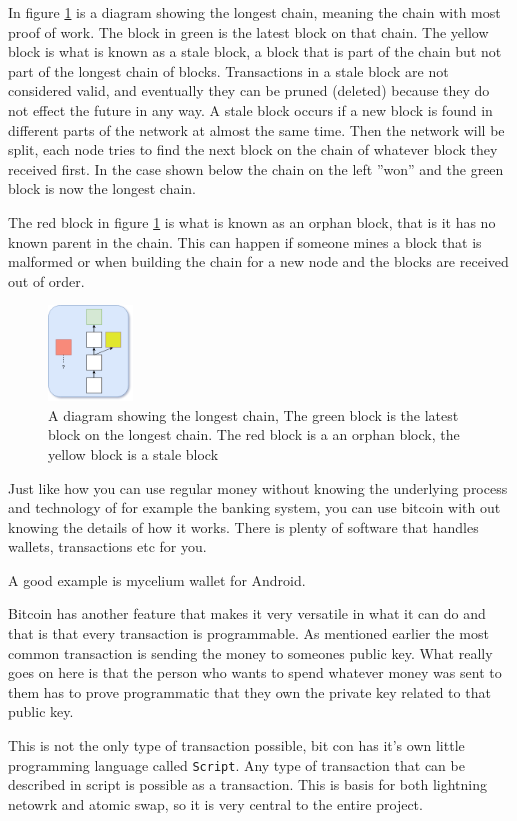 In figure \ref{fig:blockchain2} is a diagram showing the longest chain, meaning the chain with most proof of work. The block in green is the latest block on that chain. The yellow block is what is known as a stale block, a block that is part of the chain but not part of the longest chain of blocks. Transactions in a stale block are not considered valid, and eventually they can be pruned (deleted) because they do not effect the future in any way. A stale block occurs if a new block is found in different parts of the network at almost the same time. Then the network will be split, each node tries to find the next block on the chain of whatever block they received first. In the case shown below the chain on the left ''won'' and the green block is now the longest chain.

The red block in figure \ref{fig:blockchain2} is what is known as an orphan block, that is it has no known parent in the chain. This can happen if someone mines a block that is malformed or when building the chain for a new node and the blocks are received out of order.

\begin{figure}[H]
	\centering
	\includegraphics[width=0.2\textwidth]{introduction/images/more_blockchain.png}
	\caption{A diagram showing the longest chain, The green block is the latest block on the longest chain. The red block is a an orphan block, the yellow block is a stale block}
	\label{fig:blockchain2}
\end{figure}


Just like how you can use regular money without knowing the underlying process and technology of for example the banking system, you can use bitcoin with out knowing the details of how it works. There is plenty of software that handles wallets, transactions etc for you. 

A good example is mycelium wallet for Android.

Bitcoin has another feature that makes it very versatile in what it can do and that is that every transaction is programmable. As mentioned earlier the most common transaction is sending the money to someones public key. What really goes on here is that the person who wants to spend whatever money was sent to them has to prove programmatic that they own the private key related to that public key. 

This is not the only type of transaction possible, bit con has it's own little programming language called \texttt{Script}. Any type of transaction that can be described in script is possible as a transaction. This is basis for both lightning netowrk and atomic swap, so it is very central to the entire project. 